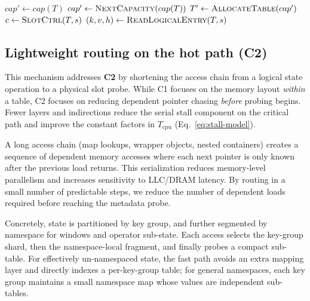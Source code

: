 \documentclass[sigconf]{acmart}
\begin{document}
\begin{algorithm}[t]
  \caption{Maintenance: rehash/grow via physical-layout rebuild.}
  \label{alg:rebuild}
  \begin{algorithmic}[1]
     
        \State $cap' \gets cap(T)$
      \Else
        \State $cap' \gets \Call{NextCapacity}{cap(T)}$
      \EndIf
      \State $T' \gets \Call{AllocateTable}{cap'}$ 
        \State $c \gets \Call{SlotCtrl}{T, s}$
          \State $(k, v, h) \gets \Call{ReadLogicalEntry}{T, s}$
          \State {} 
        \EndIf
      \EndFor
      \State {} 
    \EndProcedure
  \end{algorithmic}
\end{algorithm}

\subsection{Lightweight routing on the hot path (C2)}
This mechanism addresses \textbf{C2} by shortening the access chain from a logical state operation to a physical slot probe. While C1 focuses on the memory layout \emph{within} a table, C2 focuses on reducing dependent pointer chasing \emph{before} probing begins.
Fewer layers and indirections reduce the serial stall component on the critical path and improve the constant factors in $T_{\mathrm{cpu}}$ (Eq.~\ref{eq:stall-model}).

A long access chain (map lookups, wrapper objects, nested containers) creates a sequence of dependent memory accesses where each next pointer is only known after the previous load returns. This serialization reduces memory-level parallelism and increases sensitivity to LLC/DRAM latency. By routing in a small number of predictable steps, we reduce the number of dependent loads required before reaching the metadata probe.

Concretely, state is partitioned by key group, and further segmented by namespace for windows and operator sub-state. Each access selects the key-group shard, then the namespace-local fragment, and finally probes a compact sub-table. For effectively un-namespaced state, the fast path avoids an extra mapping layer and directly indexes a per-key-group table; for general namespaces, each key group maintains a small namespace map whose values are independent sub-tables.
\end{document}
